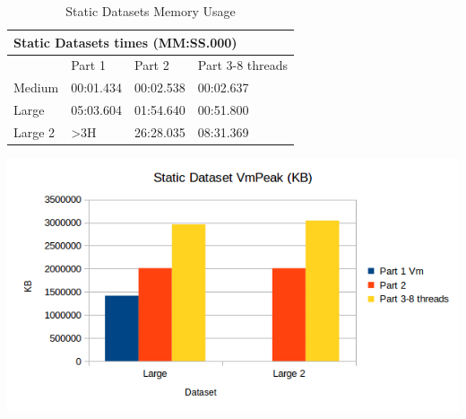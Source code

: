 \documentclass[11pt]{article}
\begin{document}
\begin{enumerate}
\begin{table}[H]
\caption{Static Datasets Memory Usage}
\begin{minipage}{.5\textwidth}
\centering
\footnotesize
\tabcolsep=0.11cm
\label{sdm}
\begin{tabular}{|l|l|l|l|}
\hline
\multicolumn{4}{|l|}{Static Datasets times (MM:SS.000)} \\ \hline
        & Part 1         & Part 2    & Part 3-8 threads \\ \hline
Medium  & 00:01.434      & 00:02.538 & 00:02.637        \\ \hline
Large   & 05:03.604      & 01:54.640 & 00:51.800        \\ \hline
Large 2 & \textgreater3H & 26:28.035 & 08:31.369        \\ \hline
\end{tabular}
\end{minipage}%
\begin{minipage}{.5\textwidth}
\includegraphics[scale=0.5]{StaticDatasets_VmPeak.png}
\end{minipage}%
\end{table}


\end{enumerate}
\end{document}
